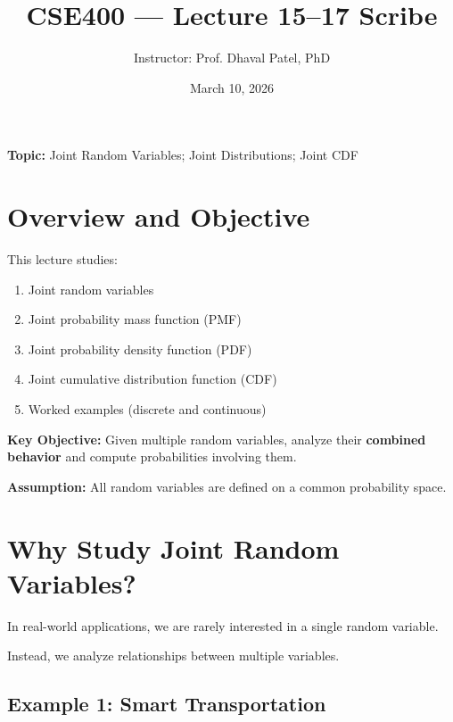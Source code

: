 \documentclass[11pt]{article}
\title{\textbf{CSE400 --- Lecture 15--17 Scribe}}
\author{Instructor: Prof. Dhaval Patel, PhD}
\date{March 10, 2026}
\begin{document}
\maketitle

\noindent \textbf{Topic:} Joint Random Variables; Joint Distributions; Joint CDF

\vspace{0.5cm}


\section{Overview and Objective}

This lecture studies:

\begin{enumerate}
    \item Joint random variables
    \item Joint probability mass function (PMF)
    \item Joint probability density function (PDF)
    \item Joint cumulative distribution function (CDF)
    \item Worked examples (discrete and continuous)
\end{enumerate}

\textbf{Key Objective:}  
Given multiple random variables, analyze their \textbf{combined behavior} and compute probabilities involving them.

\textbf{Assumption:}  
All random variables are defined on a common probability space.

\vspace{0.5cm}


\section{Why Study Joint Random Variables?}

In real-world applications, we are rarely interested in a single random variable.

Instead, we analyze relationships between multiple variables.

\vspace{0.3cm}

\subsection{Example 1: Smart Transportation}
\end{document}
